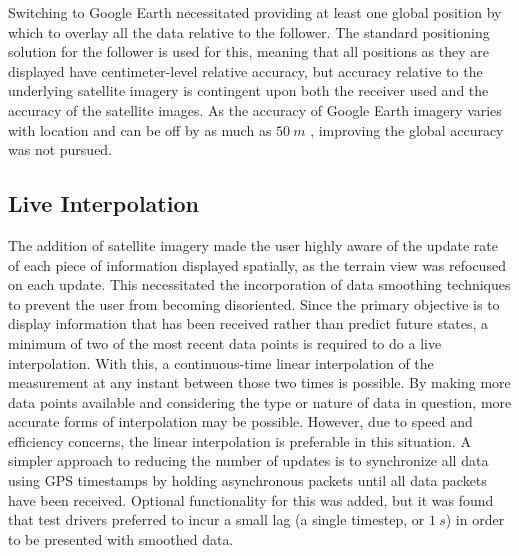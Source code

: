 \documentclass[twocolumn,10pt]{article}
\begin{document}
    Switching to Google Earth necessitated providing at least one global position by which to overlay all the data relative to the follower.  The standard positioning solution for the follower is used for this, meaning that all positions as they are displayed have centimeter-level relative accuracy, but accuracy relative to the underlying satellite imagery is contingent upon both the receiver used and the accuracy of the satellite images.  As the accuracy of Google Earth imagery varies with location and can be off by as much as $50~m$ \cite{ge_accuracy}, improving the global accuracy was not pursued.


  \subsection*{Live Interpolation}

    The addition of satellite imagery made the user highly aware of the update rate of each piece of information displayed spatially, as the terrain view was refocused on each update.  This necessitated the incorporation of data smoothing techniques to prevent the user from becoming disoriented.
    Since the primary objective is to display information that has been received rather than predict future states, a minimum of two of the most recent data points is required to do a live interpolation.  With this, a continuous-time linear interpolation of the measurement at any instant between those two times is possible.  By making more data points available and considering the type or nature of data in question, more accurate forms of interpolation may be possible. However, due to speed and efficiency concerns, the linear interpolation is preferable in this situation.
    A simpler approach to reducing the number of updates is to synchronize all data using GPS timestamps by holding asynchronous packets until all data packets have been received.  Optional functionality for this was added, but it was found that test drivers preferred to incur a small lag (a single timestep, or $1~s$) in order to be presented with smoothed data.
    
\end{document}
